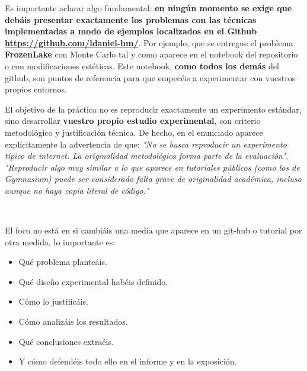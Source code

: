 \documentclass[a4paper, 11pt]{article}
\begin{document}


Es importante aclarar algo fundamental: \textbf{en ningún momento se exige que debáis presentar exactamente los problemas con las técnicas implementadas a modo de ejemplos localizados en el Github \url{https://github.com/ldaniel-hm/}}. Por ejemplo,  que se entregue el problema \textbf{FrozenLake} con Monte Carlo tal y como aparece en el notebook del repositorio o con modificaciones estéticas. Este notebook, \textbf{como todos los demás} del github, son puntos de referencia para que empecéis a experimentar con vuestros propios entornos.

El objetivo de la práctica no es reproducir exactamente un experimento estándar, sino desarrollar \textbf{vuestro propio estudio experimental}, con criterio metodológico y justificación técnica. De hecho, en el enunciado aparece explícitamente la advertencia de que: \textit{"No se busca reproducir un experimento típico de internet. La originalidad metodológica forma parte de la evaluación"{}}. \textit{"{}Reproducir algo muy similar a lo que aparece en tutoriales públicos (como los de Gymnasium) puede ser considerado falta grave de originalidad académica, incluso aunque no haya copia literal de código."{}} 

$ $\hfill {}

El foco no está en si cambiáis una media que aparece en un git-hub o tutorial por otra medida, lo importante es:

\begin{itemize}
\item
Qué problema planteáis.
\item
Qué diseño experimental habéis definido.
\item
Cómo lo justificáis.
\item
Cómo analizáis los resultados.
\item
Qué conclusiones extraéis.
\item
Y cómo defendéis todo ello en el informe y en la exposición.
\end{itemize}
\end{document}
